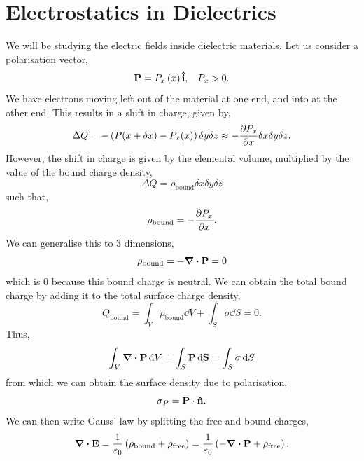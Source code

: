 \documentclass{book}
\begin{document}
\section{Electrostatics in Dielectrics}
We will be studying the electric fields inside dielectric materials. Let us consider a polarisation vector,
\begin{equation}
	\vb{P} = P_x\left(x\right)\vu{i}, \hspace{0.3cm} P_x > 0.
\end{equation}
We have electrons moving left out of the material at one end, and into at the other end. This results in a shift in charge, given by,
\begin{equation}
	\Delta Q = -\left(P(x + \delta x) - P_x(x)\right)\delta y \delta z \approx -\pdv{P_x}{x} \delta x \delta y \delta z.
\end{equation}
However, the shift in charge is given by the elemental volume, multiplied by the value of the bound charge density,
\begin{equation}
	\Delta Q = \rho_{\text{bound}} \delta x \delta y \delta z
\end{equation}
such that,
\begin{equation}
	\rho_{\text{bound}} = -\pdv{P_x}{x}.
\end{equation}
We can generalise this to 3 dimensions,
\begin{equation}
	\rho_{\text{bound}} = -\div{\vb{P}} = 0
\end{equation}
which is 0 because this bound charge is neutral. We can obtain the total bound charge by adding it to the total surface charge density,
\begin{equation}
	Q_{\text{bound}} = \int_V\rho_{\text{bound}}\dd{V} + \int_S\sigma\dd{S} = 0.
\end{equation}
Thus,
\begin{equation}
	\int_V \div{\vb{P}}\dd{V} = \int_S\vb{P}\dd{\vb{S}} = \int_{S} \sigma \dd{S}
\end{equation}
from which we can obtain the surface density due to polarisation,
\begin{equation}
	\sigma_P = \vb{P} \cdot\vu{n}.
\end{equation}
We can then write Gauss' law by splitting the free and bound charges,
\begin{equation}
	\div{\vb{E}} = \frac{1}{\varepsilon_0}\left(\rho_{\text{bound}} + \rho_{\text{free}}\right) = \frac{1}{\varepsilon_0}\left(-\div{\vb{P}} + \rho_{\text{free}}\right). \label{eq:fkjhdsal}
\end{equation}
\end{document}
